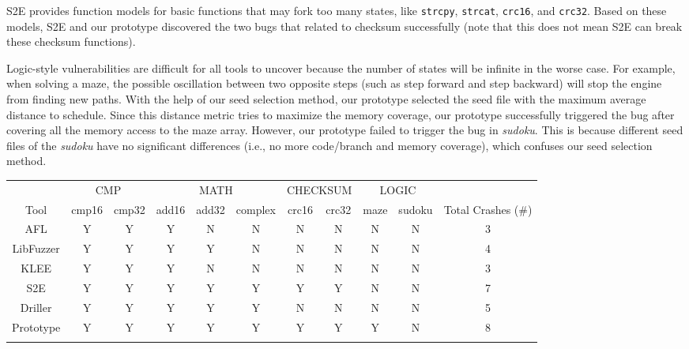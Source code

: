 S2E provides function models for basic functions that may fork too many states, like \texttt{strcpy}, \texttt{strcat}, \texttt{crc16}, and \texttt{crc32}. Based on these models, S2E and our prototype discovered the two bugs that related to checksum successfully (note that this does not mean S2E can break these checksum functions). 

Logic-style vulnerabilities are difficult for all tools to uncover because the number of states will be infinite in the worse case.
 For example, when solving a maze, the possible oscillation between two opposite steps (such as step forward and step backward) will stop the engine from finding new paths.
 With the help of our seed selection method, our prototype selected the seed file with the maximum average distance to schedule. Since this distance metric tries to maximize the memory coverage, our prototype successfully triggered the bug after covering all the memory access to the maze array. 
 However, our prototype failed to trigger the bug in \textit{sudoku}. 
 This is because different seed files of the \textit{sudoku} have no significant differences (i.e., no more code/branch and memory coverage), which confuses our seed selection method.

\begin{table}[!t]
{\begin{tabular*}{20pc}{ccccccccccc}\toprule
	& \multicolumn{2}{c}{CMP}  & \multicolumn{3}{c}{MATH} & \multicolumn{2}{c}{CHECKSUM} & 	\multicolumn{2}{c}{LOGIC} & \\ 
	    Tool & cmp16 & cmp32 & add16 & add32 & complex & crc16 & crc32 & maze & sudoku & Total Crashes (\#) \\
\midrule
		AFL 		& Y & Y & Y & N & N & N & N & N & N & 3 \\
		LibFuzzer	& Y & Y & Y & Y & N & N & N & N & N & 4\\
		KLEE		& Y & Y & Y & N & N & N & N & N & N & 3\\
		S2E			& Y & Y & Y & Y & Y & Y & Y & N & N & 7\\
		Driller		& Y & Y & Y & Y & Y & N & N & N & N & 5\\
		Prototype	& Y & Y & Y & Y & Y & Y & Y & Y & N & 8\\
\botrule
\end{tabular*}}{}
\end{table}

